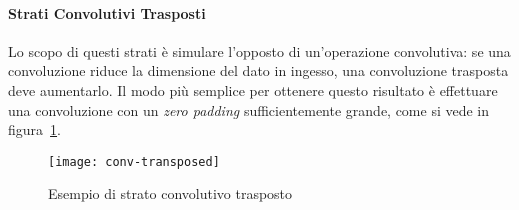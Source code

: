 \paragraph{Strati Convolutivi Trasposti}
Lo scopo di questi strati è simulare l'opposto di un'operazione convolutiva: se una convoluzione riduce la dimensione del dato in ingesso, una convoluzione trasposta deve aumentarlo.
Il modo più semplice per ottenere questo risultato è effettuare una convoluzione con un \textit{zero padding} sufficientemente grande, come si vede in figura~\ref{fig:conv-transposed}.


\begin{figure}[ht]
\centering
  \texttt{[image: conv-transposed]}
    \caption{Esempio di strato convolutivo trasposto}
    \label{fig:conv-transposed}
\end{figure}



